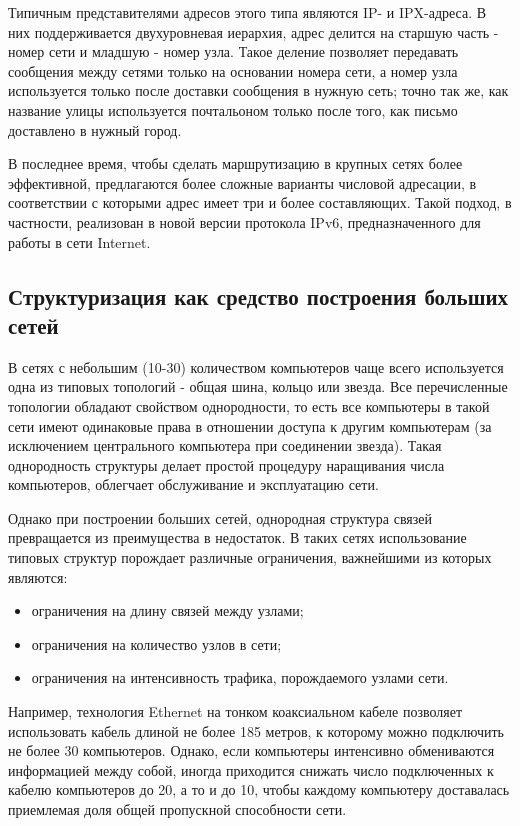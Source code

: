 Типичным представителями адресов этого типа являются IP- и IPX-адреса.
В них поддерживается двухуровневая иерархия, адрес делится на старшую часть - номер сети и младшую - номер узла.
Такое деление позволяет передавать сообщения между сетями только на основании номера сети, а номер узла используется только после доставки сообщения в нужную сеть; точно так же, как название улицы используется почтальоном только после того, как письмо доставлено в нужный город.

В последнее время, чтобы сделать маршрутизацию в крупных сетях более эффективной, предлагаются более сложные варианты числовой адресации, в соответствии с которыми адрес имеет три и более составляющих.
Такой подход, в частности, реализован в новой версии протокола IPv6, предназначенного для работы в сети Internet.

\subsection{Структуризация как средство построения больших сетей}

В сетях с небольшим (10-30) количеством компьютеров чаще всего используется одна из типовых топологий - общая шина, кольцо или звезда.
Все перечисленные топологии обладают свойством однородности, то есть все компьютеры в такой сети имеют одинаковые права в отношении доступа к другим компьютерам (за исключением центрального компьютера при соединении звезда).
Такая однородность структуры делает простой процедуру наращивания числа компьютеров, облегчает обслуживание и эксплуатацию сети.

Однако при построении больших сетей, однородная структура связей превращается из преимущества в недостаток.
В таких сетях использование типовых структур порождает различные ограничения, важнейшими из которых являются:
\begin{itemize}
    \item ограничения на длину связей между узлами;
    \item ограничения на количество узлов в сети;
    \item ограничения на интенсивность трафика, порождаемого узлами сети.
\end{itemize}

Например, технология Ethernet на тонком коаксиальном кабеле позволяет использовать кабель длиной не более 185 метров, к которому можно подключить не более 30 компьютеров.
Однако, если компьютеры интенсивно обмениваются информацией между собой, иногда приходится снижать число подключенных к кабелю компьютеров до 20, а то и до 10, чтобы каждому компьютеру доставалась приемлемая доля общей пропускной способности сети.

